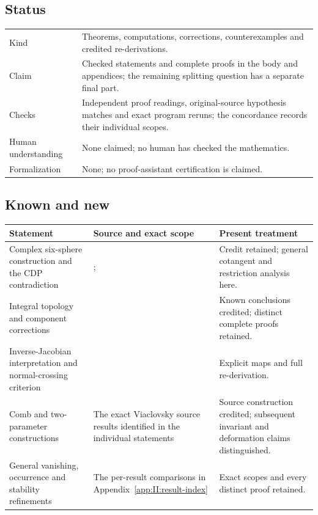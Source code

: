 \subsection*{Status}
\begin{tabular}{@{}p{31mm}p{120mm}@{}}
\toprule
Kind & Theorems, computations, corrections, counterexamples and credited re-derivations.\\
Claim & Checked statements and complete proofs in the body and appendices; the remaining splitting question has a separate final part.\\
Checks & Independent proof readings, original-source hypothesis matches and exact program reruns; the concordance records their individual scopes.\\
Human understanding & None claimed; no human has checked the mathematics.\\
Formalization & None; no proof-assistant certification is claimed.\\
\bottomrule
\end{tabular}

\subsection*{Known and new}
\begin{tabular}{@{}p{43mm}p{69mm}p{37mm}@{}}
\toprule
Statement & Source and exact scope & Present treatment\\
\midrule
Complex six-sphere construction and the CDP contradiction &
\citet[Theorem~10.5 and Section~1.2]{AC2026}; \citet[main theorem]{Engel2026}&
Credit retained; general cotangent and restriction analysis here.\\
Integral topology and component corrections &
\citet[Theorems~7.17, 7.22; Lemmas~2.7, 10.7; Section~10.5]{AC2026}&
Known conclusions credited; distinct complete proofs retained.\\
Inverse-Jacobian interpretation and normal-crossing criterion &
\citet[Theorems~1.1, 1.3; Proposition~3.4; Corollary~3.5]{GS2014}&
Explicit maps and full re-derivation.\\
Comb and two-parameter constructions &
The exact Viaclovsky source results identified in the individual statements&
Source construction credited; subsequent invariant and deformation claims distinguished.\\
General vanishing, occurrence and stability refinements &
The per-result comparisons in Appendix~\ref{app:II:result-index}&
Exact scopes and every distinct proof retained.\\
\bottomrule
\end{tabular}

